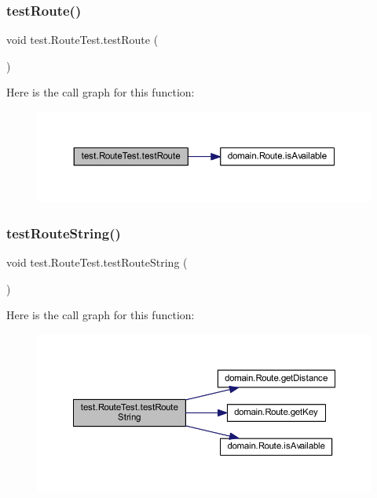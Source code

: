 \subsubsection{\texorpdfstring{test\+Route()}{testRoute()}}
{\footnotesize\ttfamily void test.\+Route\+Test.\+test\+Route (\begin{DoxyParamCaption}{ }\end{DoxyParamCaption})}

Here is the call graph for this function\+:\nopagebreak
\begin{figure}[H]
\begin{center}
\leavevmode
\includegraphics[width=350pt]{classtest_1_1_route_test_a7f25c69e5d23bf66b691c488755dbfc9_cgraph}
\end{center}
\end{figure}
\mbox{\label{classtest_1_1_route_test_acb2270c45a7b7d0b4abf79c096f06db1}} 
\subsubsection{\texorpdfstring{test\+Route\+String()}{testRouteString()}}
{\footnotesize\ttfamily void test.\+Route\+Test.\+test\+Route\+String (\begin{DoxyParamCaption}{ }\end{DoxyParamCaption})}

Here is the call graph for this function\+:\nopagebreak
\begin{figure}[H]
\begin{center}
\leavevmode
\includegraphics[width=350pt]{classtest_1_1_route_test_acb2270c45a7b7d0b4abf79c096f06db1_cgraph}
\end{center}
\end{figure}
\mbox{\label{classtest_1_1_route_test_a52c3fdb8ab37480b0fecd7e9b6fa0f06}} 
